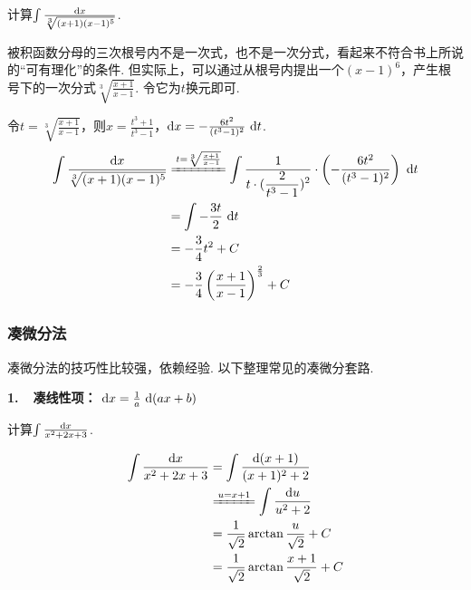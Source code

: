 \begin{example}
\label{ex:ch03-02}
计算$\int \frac{\mathrm{d} x}{\sqrt[3]{(x+1)(x-1)^5}}$.
\end{example}

\begin{analysis}
被积函数分母的三次根号内不是一次式，也不是一次分式，看起来不符合书上所说的“可有理化”的条件.
但实际上，可以通过从根号内提出一个$(x-1)^6$，产生根号下的一次分式$\sqrt[3]{\frac{x+1}{x-1}}$. 令它为$t$换元即可.
\end{analysis}

\begin{solution}
令$t = \sqrt[3]{\frac{x+1}{x-1}}$，则$x = \frac{t^3 +1 }{t^3 -1}$，$\mathrm{d} x = -\frac{6t^2}{(t^3-1)^2}~\mathrm{d} t$.
\begin{align*}
        \int \frac{\d x}{\sqrt[3]{(x+1)(x-1)^5}}
        &\xlongequal{t = \sqrt[3]{\frac{x+1}{x-1}}}
         \int \frac{1}{t \cdot (\displaystyle\frac{2}{t^3-1})^2 }\cdot \left( -\frac{6t^2}{(t^3-1)^2} \right) ~\d t \\
        &= \int -\frac{3t}{2}~\d t \\
        &= -\frac{3}{4}t^2 + C \\
        &= -\frac{3}{4}\left( \frac{x+1}{x-1} \right)^{\frac{2}{3}} + C
\end{align*}
\end{solution}

\subsubsection{凑微分法}\par
凑微分法的技巧性比较强，依赖经验.
以下整理常见的凑微分套路.\vspace{0.5em}

\textbf{1.~~凑线性项：$~\mathrm{d} x = \frac{1}{a}~\mathrm{d} (ax+b)$}

\begin{example}
\label{ex:ch03-03}
计算$\int \frac{\mathrm{d} x}{x^2+2x+3}$.
\end{example}

\begin{solution}
\begin{equation}
    \begin{aligned}
        \int \frac{\d x}{x^2+2x+3}
        &= \int \frac{\d (x+1)}{(x+1)^2 + 2} \\
        &\xlongequal{u=x+1} \int \frac{\d u}{u^2+2} \\
        &= \frac{1}{\sqrt{2}} \arctan{\frac{u}{\sqrt{2}}} +C \\
        &= \frac{1}{\sqrt{2}} \arctan{\frac{x+1}{\sqrt{2}}} +C
        \nonumber
    \end{aligned}
\end{equation}
\end{solution}

